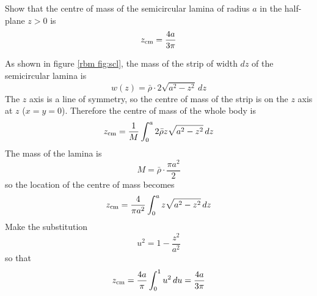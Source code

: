 \begin{example}
\problem
Show that the centre of mass of the semicircular lamina of radius $a$ in the
half-plane $z>0$ is
$$z_{\rm cm}=\frac{4a}{3\pi}$$

\solution
As shown in figure \ref{rbm fig:scl}, the mass of 
the strip of width $dz$ of the semicircular lamina is
$$w(z)=\bar{\rho}\cdot2\sqrt{a^2-z^2}\,dz$$
The $z$ axis is a line of symmetry, so the centre of mass of the strip is on
the $z$ axis at $z$ ($x=y=0$).  Therefore the centre of mass of the whole
body is
$$z_{\rm cm}=\frac{1}{M}\int_0^a 2\bar{\rho}z\sqrt{a^2-z^2}\,dz$$
The mass of the lamina is
$$M=\bar{\rho}\cdot\frac{\pi a^2}{2}$$
so the location of the centre of mass becomes
$$z_{\rm cm}=\frac{4}{\pi a^2}\int_0^a z\sqrt{a^2-z^2}\,dz$$
Make the substitution
$$u^2=1-\frac{z^2}{a^2}$$
so that
$$z_{\rm cm}=\frac{4a}{\pi}\int_0^1 u^2\,du=\frac{4a}{3\pi}$$
\end{example}


